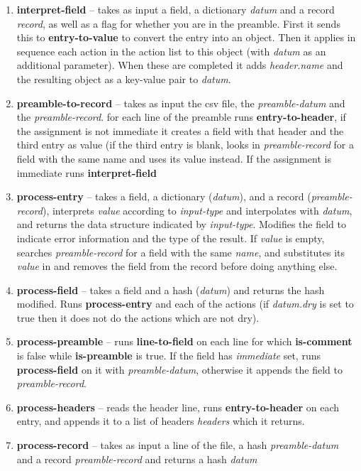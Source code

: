 \documentclass{article}
\begin{document}
\begin{enumerate}
\item \textbf{interpret-field} -- takes as input a field, a dictionary
  \emph{datum} and a record \emph{record}, as well as a flag for
  whether you are in the preamble.  First it sends this to
  \textbf{entry-to-value} to convert the entry into an object.
  Then it applies in sequence each action in the action list to this
  object (with \emph{datum} as an additional parameter).  When
  these are completed it adds \emph{header}.\emph{name} and the
  resulting object as a key-value pair to \emph{datum}. 
\item \textbf{preamble-to-record} -- takes as input the csv file, the
  \emph{preamble-datum} and the \emph{preamble-record}.  for each line
  of the preamble runs \textbf{entry-to-header}, if the assignment is
  not immediate it creates a field with that header and the third
  entry as value (if the third entry is blank, looks in
  \emph{preamble-record} for a field with the same name and uses its
  value instead.  If the assignment is immediate runs \textbf{interpret-field}  
\item \textbf{process-entry} -- takes a field, a dictionary
  (\emph{datum}), and a record (\emph{preamble-record}), interprets \emph{value} according to
  \emph{input-type}  and interpolates with
  \emph{datum}, and returns the data structure indicated by
  \emph{input-type}.  Modifies the field to indicate error information
  and the type of the result.  If \emph{value} is empty, searches
  \emph{preamble-record} for a field with the same \emph{name}, and
  substitutes its \emph{value} in and removes the field from the record before doing anything else.  
\item \textbf{process-field} -- takes a field and a hash
  (\emph{datum}) and returns the hash modified.  Runs \textbf{process-entry}
  and each of the actions (if \emph{datum.dry} is set to true then it
  does not do the actions which are not dry).
\item \textbf{process-preamble} -- runs \textbf{line-to-field} on each
  line for which \textbf{is-comment} is false while
  \textbf{is-preamble} is true.  If the field has \emph{immediate}
  set, runs \textbf{process-field} on it with \emph{preamble-datum},
  otherwise it appends the field to \emph{preamble-record}.  
\item \textbf{process-headers} -- reads the header line, runs
  \textbf{entry-to-header} on each entry, and appends it to a list of
  headers \emph{headers} which it returns.
\item \textbf{process-record} -- takes as input a line of the file, a
  hash \emph{preamble-datum} and a record \emph{preamble-record} and returns
  a hash \emph{datum}
\end{enumerate}
\end{document}
